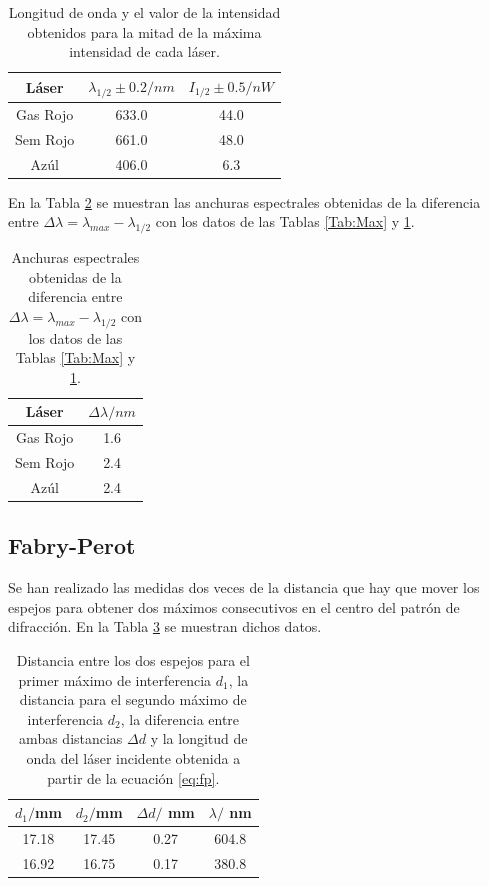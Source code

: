 \documentclass[twoside]{article}
\begin{document}
\begin{multicols}{2}
					\begin{table}[H]
						\centering
						\begin{tabular}{c c c}
							\hline
							\centering
								Láser & $\lambda_{1/2} \pm 0.2 /nm$ & $I_{1/2} \pm 0.5 /nW$ \\ \hline
								Gas Rojo & 633.0 & 44.0 \\
								Sem Rojo & 661.0 & 48.0 \\
								Azúl & 406.0 & 6.3 \\ \hline
						\end{tabular}
						\caption{\label{Tab:media}Longitud de onda y el valor de la intensidad obtenidos para la mitad de la máxima intensidad de cada láser.}
					\end{table}

				En la Tabla \ref{Tab:deltaLambda} se muestran las anchuras espectrales obtenidas de la diferencia entre $\Delta \lambda = \lambda_{max} - \lambda_{1/2}$ con los datos de las Tablas \ref{Tab:Max} y \ref{Tab:media}.

					\begin{table}[H]
						\centering
						\begin{tabular}{c c}
							\hline
							\centering
								Láser & $\Delta \lambda / nm$ \\ \hline
								Gas Rojo & 1.6 \\
								Sem Rojo & 2.4 \\
								Azúl & 2.4 \\ \hline
						\end{tabular}
						\caption{\label{Tab:deltaLambda}Anchuras espectrales obtenidas de la diferencia entre $\Delta \lambda = \lambda_{max} - \lambda_{1/2}$ con los datos de las Tablas \ref{Tab:Max} y \ref{Tab:media}.}
					\end{table}

			\subsection{Fabry-Perot}

				Se han realizado las medidas dos veces de la distancia que hay que mover los espejos para obtener dos máximos consecutivos en el centro del patrón de difracción. En la Tabla \ref{Tab:FP} se muestran dichos datos.

					\begin{table}[H]
						\centering
						\begin{tabular}{c c c c}
							\hline
							\centering
								$d_1 /$mm & $d_2 /$mm & $\Delta d /$ mm & $\lambda /$ nm\\ \hline
								17.18 & 17.45 & 0.27 & 604.8 \\
								16.92 & 16.75 & 0.17 & 380.8 \\ \hline
						\end{tabular}
						\caption{\label{Tab:FP}Distancia entre los dos espejos para el primer máximo de interferencia $d_1$, la distancia para el segundo máximo de interferencia $d_2$, la diferencia entre ambas distancias $\Delta d$ y la longitud de onda del láser incidente obtenida a partir de la ecuación \ref{eq:fp}.}
					\end{table}


\end{multicols}
\end{document}
